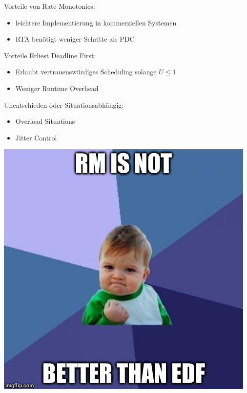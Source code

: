 \begin{frame}{\secname}
	Vorteile von Rate Monotonics:\pause
	\begin{itemize}
		\item leichtere Implementierung in kommerziellen Systemen
		\item RTA benötigt weniger Schritte als PDC
	\end{itemize}\pause
	Vorteile Erliest Deadline First:\pause
	\begin{itemize}
		\item Erlaubt vertrauenswürdiges Scheduling solange $U \leq 1$
		\item Weniger Runtime Overhead
	\end{itemize}\pause
	Unentschieden oder Situationsabhängig:\pause
	\begin{itemize}
		\item Overload Situations
		\item Jitter Control
	\end{itemize}
\end{frame}

\begin{frame}{\secname}
	\begin{center}
		\includegraphics[scale=0.35]{graphics/memes/success.jpg}
	\end{center}
\end{frame}

